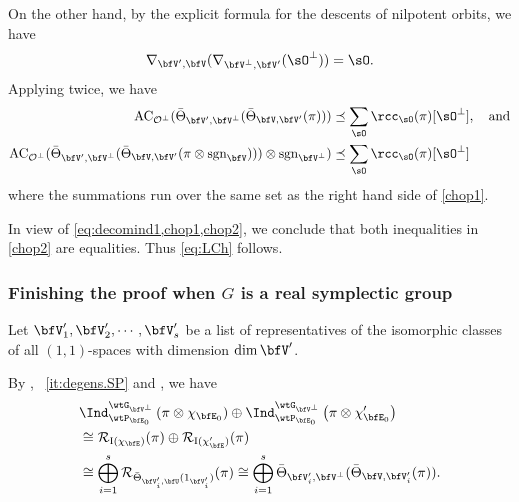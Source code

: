 \documentclass[12pt,a4paper]{amsart}
\newcommand{\AC}{\mathrm{AC}}
\newcommand{\CO}{{\mathcal {O}}}
\newcommand{\CR}{{\mathcal {R}}}
\newcommand{\RI}{{\mathrm {I}}}
\newcommand{\sgn}{\operatorname{sgn}}
\def\DD{\nabla}
\numberwithin{equation}{section}
\newtheorem{lem}[thm]{Lemma}
\theoremstyle{remark}
\def\abfV{\bfV'}
\def\Thetab{\bar{\Theta}}
\def\bfVpe{\bfV^\perp}
\begin{document}
  On the other hand, by the explicit formula for the descents  of nilpotent orbits,
  we have
  \[
    \DD_{\abfV,\bfV} (\DD_{\bfVpe,\abfV}(\sO^\perp))=\sO.
  \]
  Applying  twice, we have
  \begin{equation}
    \label{chop2}
    \begin{split}
      \AC_{ \CO^\perp}(\Thetab_{\abfV,\bfVpe}(\Thetab_{\bfV,\abfV}(\pi))) &\preceq
      \sum_{\sO} \rcc_\sO(\pi) [\sO^\perp ], \quad \text{and}\\
      \AC_{ \CO^\perp} (\Thetab_{\abfV,\bfVpe}(\Thetab_{\bfV,\abfV}(\pi\otimes
      \sgn_{\bfV})))\otimes \sgn_{\bfV^\perp}) &\preceq \sum_{\sO}
      \rcc_\sO(\pi) [\sO^\perp ]
    \end{split}
  \end{equation}
  where the summations  run over the same set as the right hand side of \cref{chop1}.

In view of \cref{eq:decomind1,chop1,chop2}, we conclude that both inequalities in \eqref{chop2} are equalities. Thus \eqref{eq:LCh} follows. %

\subsubsection{Finishing the proof when $G$ is a real symplectic group}\label{sec:PC.rsp}
Let $\abfV_1, \abfV_2, \cdots, \abfV_s$ be a list of representatives of the
isomorphic  classes of all $(1,1)$-spaces %
with dimension $\dim \abfV$.


By , ~\ref{it:degens.SP} and , we have
\begin{equation}
\label{decomind2}
\begin{split}
  & \Ind_{\wtP_{\bfE_0}}^{\wtG_{\bfVpe}} \left(\pi\otimes \chi_{\bfE_0}\right)
  \oplus \Ind_{\wtP_{\bfE_0}}^{\wtG_{\bfVpe}} \left(\pi\otimes \chi'_{\bfE_0}\right)\\
 &\cong \CR_{\RI(\chi_{\bfE})} (\pi)\oplus \CR_{\RI(\chi'_{\bfE})} (\pi)\\
 &\cong \bigoplus_{i=1}^s \CR_{\Thetab_{\abfV_i,\bfU}(1_{\abfV_i})}(\pi)
 \cong \bigoplus_{i=1}^s \Thetab_{\abfV_i,\bfVpe}(\Thetab_{\bfV,\abfV_i}(\pi)).
\end{split}
\end{equation}
\end{document}
